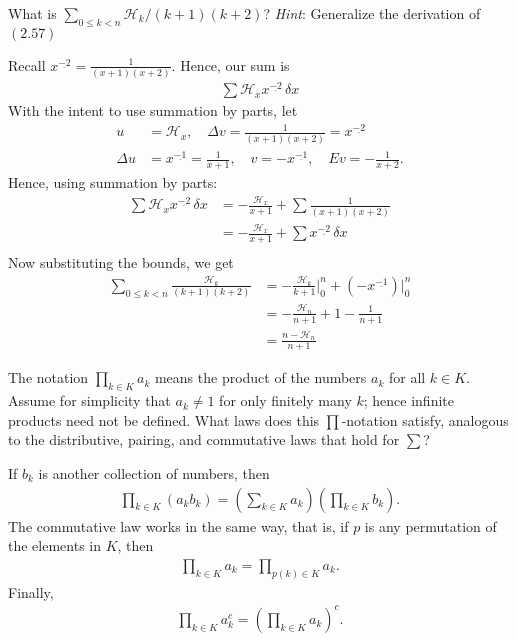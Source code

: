 \documentclass[12pt]{article}
\newenvironment{ex}[2][Exercise]{\begin{trivlist}
		\item[\hskip \labelsep {\bfseries #1}\hskip \labelsep {\bfseries #2.}]}{\end{trivlist}}
\newenvironment{sol}[1][Solution]{\begin{trivlist}
		\item[\hskip \labelsep {\bfseries #1:}]}{\end{trivlist}}
\begin{document}
\begin{ex}{24}
	What is $\sum_{0\leq k<n}\mathcal{H}_k/(k+1)(k+2)$? \emph{Hint}: Generalize the derivation
	of $(2.57)$
\end{ex}

\begin{sol}
	Recall $x^{\underline{-2}}=\frac{1}{(x+1)(x+2)}$. Hence, our sum is
	\begin{align*}
		\sum \mathcal{H}_x x^{\underline{-2}}\, \delta x
	\end{align*}
	With the intent to use summation by parts, let
	\begin{align*}
		u&=\mathcal{H}_x,\quad \Delta v= \frac{1}{(x+1)(x+2)}=x^{\underline{-2}}\\
		\Delta u&=x^{\underline{-1}}=\frac{1}{x+1},\quad v=-x^{\underline{-1}},\quad Ev=-\frac{1}{x+2}.
	\end{align*}
	Hence, using summation by parts:
	\begin{align*}
		\sum \mathcal{H}_x x^{\underline{-2}}\, \delta x
		&=-\frac{\mathcal{H}_x}{x+1}+\sum\frac{1}{(x+1)(x+2)}\\
		&=-\frac{\mathcal{H}_x}{x+1}+\sum x^{\underline{-2}}\,\delta x\\
	\end{align*}
	Now substituting the bounds, we get
	\begin{align*}
		\sum_{0\leq k<n}\frac{\mathcal{H}_k}{(k+1)(k+2)}&=-\frac{\mathcal{H}_k}{k+1}\bigg\rvert_{0}^{n}
		+(-x^{\underline{-1}})\bigg\rvert_{0}^{n}\\
		&=-\frac{\mathcal{H}_n}{n+1}+1-\frac{1}{n+1}\\
		&=\frac{n-\mathcal{H}_n}{n+1}
	\end{align*}
\end{sol}

\begin{ex}{25}
	The notation $\prod_{k\in K}a_k$ means the product of the numbers $a_k$ for all
	$k\in K$. Assume for simplicity that $a_k\neq 1$ for only finitely many $k$;
	hence infinite products need not be defined. What laws does this $\prod$-notation
	satisfy, analogous to the distributive, pairing, and commutative laws that
	hold for $\sum$?
\end{ex}

\begin{sol}
	If $b_k$ is another collection of numbers, then
	\begin{align*}
		\prod_{k\in K}(a_kb_k)=\left(\sum_{k\in K}a_k\right)\left(\prod_{k\in K}b_k\right).
	\end{align*}
	The commutative law works in the same way, that is, if $p$ is any permutation
	of the elements in $K$, then
	\begin{align*}
		\prod_{k\in K}a_k=\prod_{p(k)\in K}a_k.
	\end{align*}
	Finally,
	\begin{align*}
		\prod_{k\in K}a_k^c=\left(\prod_{k\in K}a_k\right)^c.
	\end{align*}
\end{sol}
\end{document}
